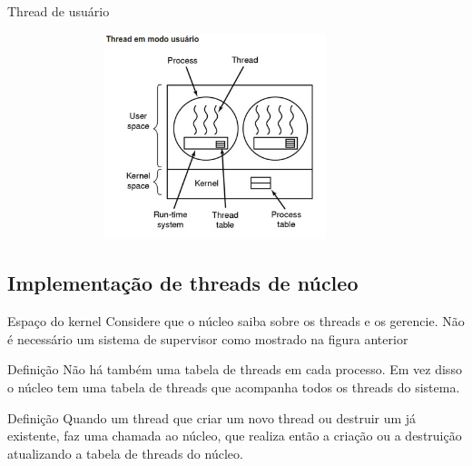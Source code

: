 \documentclass[11pt]{beamer}
\begin{document}
\begin{frame}{ Thread de usuário}
\begin{figure}[h]

\includegraphics[width=100mm, height=60mm]{Figuras/threadusuario}
\end{figure}

\end{frame}

\subsection*{Implementação de threads de núcleo}

\begin{frame}{Espaço do kernel}
 Considere que o núcleo saiba sobre os threads e os gerencie.
 Não é necessário um sistema de supervisor como mostrado na figura anterior
 
 \pause
 \begin{block}{Definição}
  Não há também uma tabela de threads em cada processo.
  Em vez disso o núcleo tem uma tabela de threads que acompanha todos os threads do sistema.
 \end{block}
 
  \pause
  \begin{block}{Definição}
  Quando um thread que criar um novo thread ou destruir um já existente, faz uma chamada ao núcleo, que realiza então a criação ou a destruição 
  atualizando a tabela de threads do núcleo.
 \end{block}
\end{frame}
\end{document}
